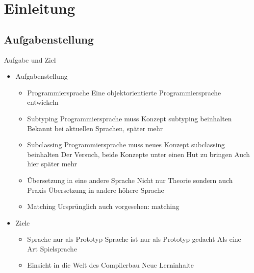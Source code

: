 \section{Einleitung}
\subsection{Aufgabenstellung}
\begin{frame}[t]{Aufgabe und Ziel}
	\begin{itemize}[<+->]
		\item Aufgabenstellung
		\begin{itemize}
			\item Programmiersprache
			 {Eine objektorientierte Programmiersprache entwickeln}

			\item Subtyping
			 {Programmiersprache muss Konzept subtyping beinhalten}
			 {Bekannt bei aktuellen Sprachen, später mehr}

			\item Subclassing
			 {Programmiersprache muss neues Konzept subclassing beinhalten}
			 {Der Versuch, beide Konzepte unter einen Hut zu bringen}
			 {Auch hier später mehr}

			\item Übersetzung in eine andere Sprache
			 {Nicht nur Theorie sondern auch Praxis}
			 {Übersetzung in andere höhere Sprache}

			\item Matching
			 {Ursprünglich auch vorgesehen: matching}
		\end{itemize}

		\item Ziele
		\begin{itemize}
			\item Sprache nur als Prototyp
			 {Sprache ist nur als Prototyp gedacht}
			 {Als eine Art Spielsprache}
			\item Einsicht in die Welt des Compilerbau
			 {Neue Lerninhalte}
		\end{itemize}

	\end{itemize}

\end{frame}

